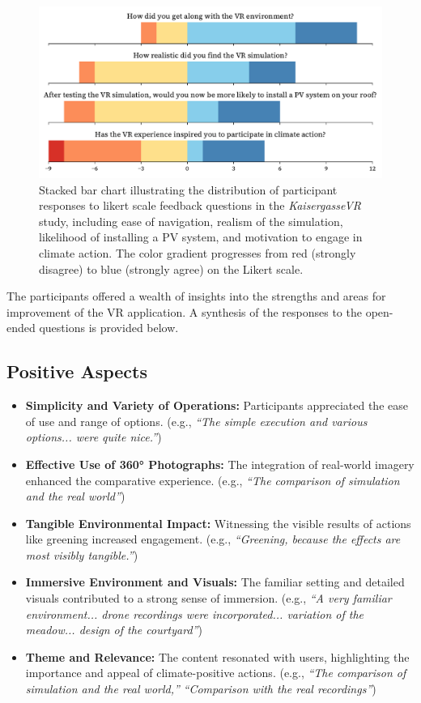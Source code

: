 \documentclass[draft, final]{vutinfth} %
\begin{document}
\begin{figure}[h]
    \centering
    \includegraphics[width=\textwidth]{graphics/feedback-kaisergasse.pdf}
    \caption{Stacked bar chart illustrating the distribution of participant responses to likert scale feedback questions in the \textit{KaisergasseVR} study, including ease of navigation, realism of the simulation, likelihood of installing a PV system, and motivation to engage in climate action. The color gradient progresses from red (strongly disagree) to blue (strongly agree) on the Likert scale.}
    \label{fig:feedback-kaisergasse}
\end{figure}

The participants offered a wealth of insights into the strengths and areas for improvement of the VR application. A synthesis of the responses to the open-ended questions is provided below. 

\subsection{Positive Aspects}

\begin{itemize}
    \item \textbf{Simplicity and Variety of Operations:} Participants appreciated the ease of use and range of options. (e.g., \textit{``The simple execution and various options... were quite nice.''})
    \item \textbf{Effective Use of 360° Photographs:} The integration of real-world imagery enhanced the comparative experience. (e.g., \textit{``The comparison of simulation and the real world''})
    \item \textbf{Tangible Environmental Impact:} Witnessing the visible results of actions like greening increased engagement. (e.g., \textit{``Greening, because the effects are most visibly tangible.''})
    \item \textbf{Immersive Environment and Visuals:} The familiar setting and detailed visuals contributed to a strong sense of immersion. (e.g., \textit{``A very familiar environment... drone recordings were incorporated... variation of the meadow... design of the courtyard''}) 
    \item \textbf{Theme and Relevance:} The content resonated with users, highlighting the importance and appeal of climate-positive actions.  (e.g., \textit{``The comparison of simulation and the real world,''} \textit{``Comparison with the real recordings''}) 
\end{itemize}
\end{document}
